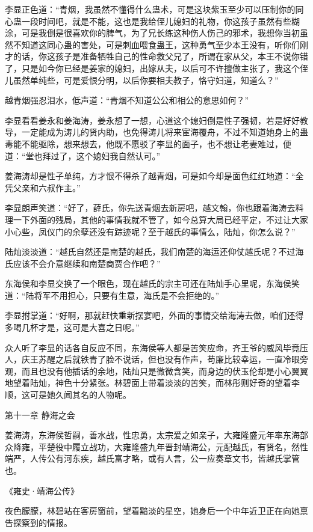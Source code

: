 李显正色道：“青烟，我虽然不懂得什么蛊术，可是这块紫玉至少可以压制你的同心蛊一段时间吧，就是不能，这也是我给侄儿媳妇的礼物，你这孩子虽然有些糊涂，可是我倒是很喜欢你的脾气，为了兄长练这种伤人伤己的邪术，我想你当初虽然不知道这同心蛊的害处，可是刺血喂食蛊王，这种勇气至少本王没有，听你们刚才的话，你这孩子是准备牺牲自己的性命救父兄了，所谓在家从父，本王不说你错了，只是如今你已经是姜家的媳妇，出嫁从夫，以后可不许擅做主张了，我这个侄儿虽然单纯些，可是爱恨分明，以后你要相夫教子，恪守妇道，知道么？”

越青烟强忍泪水，低声道：“青烟不知道公公和相公的意思如何？”

李显看看姜永和姜海涛，姜永想了一想，心道这个媳妇倒是性子强韧，若是好好教导，一定能成为涛儿的贤内助，也免得涛儿将来宦海覆舟，不过不知道她身上的蛊毒能不能驱除，想来想去，他既不愿驳了李显的面子，也不想让老妻难过，便道：“堂也拜过了，这个媳妇我自然认可。”

姜海涛却是性子单纯，方才恨不得杀了越青烟，可是如今却是面色红红地道：“全凭父亲和六叔作主。”

李显朗声笑道：“好了，薛氏，你先送青烟去新房吧，越文翰，你也跟着海涛去料理一下外面的残局，其他的事情我就不管了，如今总算大局已经平定，不过让大家小心些，凤仪门的余孽还没有踪迹呢？至于越氏的事情么，陆灿，你怎么说？”

陆灿淡淡道：“越氏自然还是南楚的越氏，我们南楚的海运还仰仗越氏呢？不过海氏应该不会介意继续和南楚商贾合作吧？”

东海侯和李显交换了一个眼色，现在越氏的宗主可还在陆灿手心里呢，东海侯笑道：“陆将军不用担心，只要有生意，海氏是不会拒绝的。”

李显拊掌道：“好啊，那就赶快重新摆宴吧，外面的事情交给海涛去做，咱们还得多喝几杯才是，这可是大喜之日呢。”

众人听了李显的话各自反应不同，东海侯等人都是苦笑应命，齐王爷的威风毕竟压人，庆王苏醒之后就铁青了脸不说话，但也没有作声，苟廉比较幸运，一直冷眼旁观，而且也没有他插话的余地，陆灿只是微微含笑，而身边的伏玉伦却是小心翼翼地望着陆灿，神色十分紧张。林碧面上带着淡淡的苦笑，而林彤则好奇的望着李顺，这可是她久闻其名的人物呢。

第十一章    静海之会

姜海涛，东海侯哲嗣，善水战，性忠勇，太宗爱之如亲子，大雍隆盛元年率东海部众降雍，平楚役中履立战功，大雍隆盛九年晋封靖海公，元配越氏，有贤名，然性端严，人传公有河东疾，越氏富才略，或有人言，公一应奏章文书，皆越氏掌管也。

《雍史·靖海公传》

夜色朦朦，林碧站在客房窗前，望着黯淡的星空，她身后一个中年近卫正在向她禀告探察到的情报。

